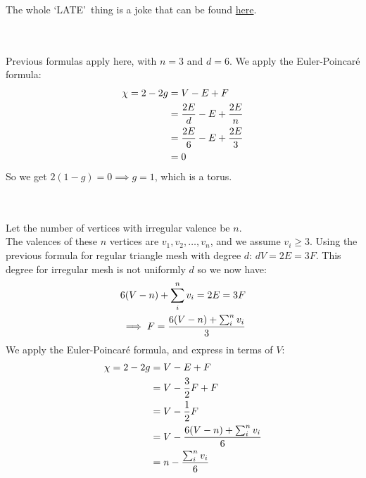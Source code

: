 \documentclass{article}
\begin{document}
The whole \lq LATE\rq \, thing is a joke that can be found \href{https://brickisland.net/DDGSpring2022/assignments/}{here}.

\pagebreak
{}\\\\

Previous formulas apply here, with $n=3$ and $d=6$.
We apply the Euler-Poincaré formula:
\begin{equation}
    \begin{split}
    \chi = 2 - 2g   &= V - E + F\\
                    &= \frac{2E}{d} - E + \frac{2E}{n}\\
                    &= \frac{2E}{6} - E + \frac{2E}{3}\\
                    &= 0
    \end{split}
    \notag
\end{equation}
So we get $2(1-g) = 0 \implies g=1$, which is a torus.


\vspace{1.8cm}
\\\\

Let the number of vertices with irregular valence be $n$.\\
The valences of these $n$ vertices are $v_1, v_2, \dots, v_n$, and we assume $v_i \ge 3$.
Using the previous formula for regular triangle mesh with degree $d$: $dV=2E=3F$.
This degree for irregular mesh is not uniformly $d$ so we now have:
\begin{align}
6(V-n)+\sum_i^n{v_i}=2E=3F
\notag\\
\implies F=\frac{6(V-n)+\sum_i^n{v_i}}{3}
\notag
\end{align}
We apply the Euler-Poincaré formula, and express in terms of $V$:
\begin{equation}
    \begin{split}
    \chi = 2 - 2g   &= V - E + F\\
                    &= V - \frac32 F + F\\
                    &= V - \frac12 F\\
                    &= V - \frac{6(V-n)+\sum_i^n{v_i}}{6}\\
                    &= n - \frac{\sum_i^n{v_i}}{6}\\
    \end{split}
    \notag
\end{equation}
\end{document}
